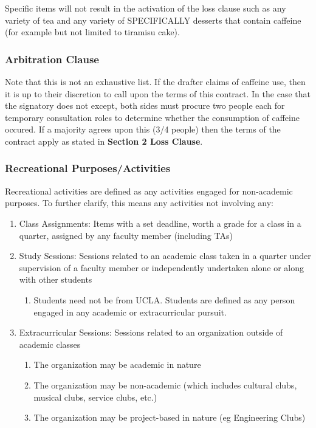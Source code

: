 \documentclass{exam}
\begin{document}
\smallskip
Specific items will not result in the activation of the loss clause such as any variety of tea and any variety of SPECIFICALLY desserts that contain caffeine (for example but not limited to tiramisu cake). 

\subsubsection{Arbitration Clause}
Note that this is not an exhaustive list. If the drafter claims of caffeine use, then it is up to their discretion to call upon the terms of this contract. In the case that the signatory does not except, both sides must procure two people each for temporary consultation roles to determine whether the consumption of caffeine occured. If a majority agrees upon this (3/4 people) then the terms of the contract apply as stated in \textbf{Section 2 Loss Clause}.

\subsubsection{Recreational Purposes/Activities}
Recreational activities are defined as any activities engaged for non-academic purposes. To further clarify, this means any activities not involving any:
\begin{enumerate}
\item Class Assignments: Items with a set deadline, worth a grade for a class in a quarter, assigned by any faculty member (including TAs)
\item Study Sessions: Sessions related to an academic class taken in a quarter under supervision of a faculty member or independently undertaken alone or along with other students
\begin{enumerate}
\item Students need not be from UCLA. Students are defined as any person engaged in any academic or extracurricular pursuit.
\end{enumerate}
\item Extracurricular Sessions: Sessions related to an organization outside of academic classes
\begin{enumerate}
\item The organization may be academic in nature
\item The organization may be non-academic (which includes cultural clubs, musical clubs, service clubs, etc.)
\item The organization may be project-based in nature (eg Engineering Clubs)
\end{enumerate}
\end{enumerate}
\end{document}
